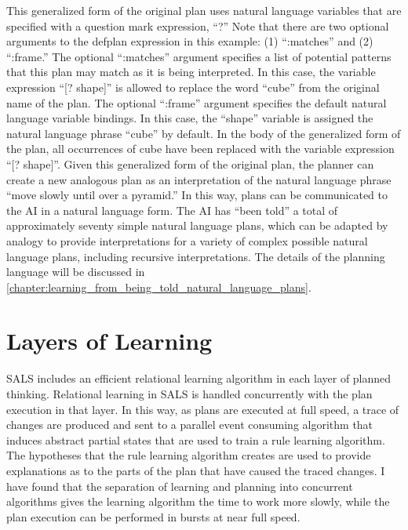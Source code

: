 This generalized form of the original plan uses natural language
variables that are specified with a question mark expression, ``?''
Note that there are two optional arguments to the defplan expression
in this example: (1) ``:matches'' and (2) ``:frame.''  The optional
``:matches'' argument specifies a list of potential patterns that this
plan may match as it is being interpreted.  In this case, the variable
expression ``[? shape]'' is allowed to replace the word ``cube'' from
the original name of the plan.  The optional ``:frame'' argument
specifies the default natural language variable bindings.  In this
case, the ``shape'' variable is assigned the natural language phrase
``cube'' by default.  In the body of the generalized form of the plan,
all occurrences of cube have been replaced with the variable
expression ``[? shape]''.  Given this generalized form of the original
plan, the planner can create a new analogous plan as an interpretation
of the natural language phrase ``move slowly until over a pyramid.''
In this way, plans can be communicated to the AI in a natural language
form.  The AI has ``been told'' a total of approximately seventy
simple natural language plans, which can be adapted by analogy to
provide interpretations for a variety of complex possible natural
language plans, including recursive interpretations.  The details of
the planning language will be discussed in
{\mbox{\autoref{chapter:learning_from_being_told_natural_language_plans}}}.

\section{Layers of Learning}

SALS includes an efficient relational learning algorithm in each layer
of planned thinking.  Relational learning in SALS is handled
concurrently with the plan execution in that layer.  In this way, as
plans are executed at full speed, a trace of changes are produced and
sent to a parallel event consuming algorithm that induces abstract
partial states that are used to train a rule learning algorithm.  The
hypotheses that the rule learning algorithm creates are used to
provide explanations as to the parts of the plan that have caused the
traced changes.  I have found that the separation of learning and
planning into concurrent algorithms gives the learning algorithm the
time to work more slowly, while the plan execution can be performed in
bursts at near full speed.

